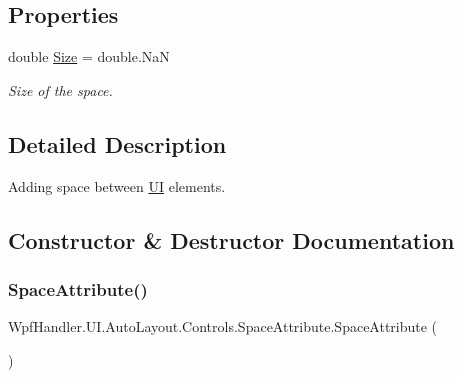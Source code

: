 \subsection*{Properties}
\begin{DoxyCompactItemize}
\item 
double \mbox{\hyperlink{class_wpf_handler_1_1_u_i_1_1_auto_layout_1_1_controls_1_1_space_attribute_a68206a96d773373166c9754a2aff971f}{Size}} = double.\+NaN
\begin{DoxyCompactList}\small\item\em Size of the space. \end{DoxyCompactList}\end{DoxyCompactItemize}


\subsection{Detailed Description}
Adding space between \mbox{\hyperlink{namespace_wpf_handler_1_1_u_i}{UI}} elements. 



\subsection{Constructor \& Destructor Documentation}
\mbox{\label{class_wpf_handler_1_1_u_i_1_1_auto_layout_1_1_controls_1_1_space_attribute_a074e315606e279957f2a10c9c86e2094}} 
\subsubsection{\texorpdfstring{Space\+Attribute()}{SpaceAttribute()}\hspace{0.1cm}{\footnotesize\ttfamily [1/2]}}
{\footnotesize\ttfamily Wpf\+Handler.\+U\+I.\+Auto\+Layout.\+Controls.\+Space\+Attribute.\+Space\+Attribute (\begin{DoxyParamCaption}{ }\end{DoxyParamCaption})}



